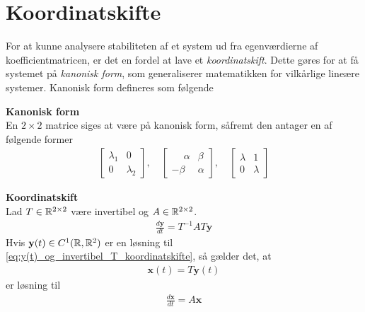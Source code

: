 
\pagebreak

\section{Koordinatskifte}

For at kunne analysere stabiliteten af et system ud fra egenværdierne af koefficientmatricen, er det en fordel at lave et \textit{koordinatskift}. Dette gøres for at få systemet på \textit{kanonisk form}, som generaliserer matematikken for vilkårlige lineære systemer.
Kanonisk form defineres som følgende 
\begin{defn}\textbf{Kanonisk form}\\
    En $2\times 2$ matrice siges at være på kanonisk form, såfremt den antager en af følgende former
%    
    \begin{align*}
        \begin{bmatrix}
            \lambda_1   &  0\\
            0           &  \lambda_2
        \end{bmatrix}, \quad
        \begin{bmatrix}
            \phantom{-}\alpha & \beta \\
            -\beta & \alpha
        \end{bmatrix}, \quad
        \begin{bmatrix}
            \lambda & 1\\
            0       & \lambda
        \end{bmatrix}
    \end{align*}
\end{defn}

\begin{thmx}\textbf{Koordinatskift}\\
Lad $T\in\mathbb{R}^{2\times 2}$ være invertibel og $A\in \mathbb{R}^{2\times 2}$.
%
\begin{align}\label{eq:y(t)_og_invertibel_T_koordinatskifte}
    \frac{d\textbf{y}}{dt} = T^{-1}AT \textbf{y}
\end{align}
%
Hvis $\textbf{y}(t)\in C^1(\mathbb{R}, \mathbb{R}^2)$ er en løsning til \eqref{eq:y(t)_og_invertibel_T_koordinatskifte}, så gælder det, at 
\begin{align}\label{eq:x(t)_koordinatskifte}
    \textbf{x}(t)=T\textbf{y}(t)
\end{align}
%
er løsning til %
%
\begin{align}\label{eq:x'(t)=Ax_koordinatskifte}
    \displaystyle \frac{d\textbf{x}}{dt}= A\textbf{x}
\end{align}


\end{thmx}

